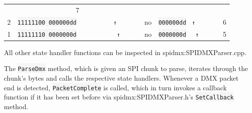 \begin{longtable}[]{@{}ccccc@{}}
\begin{minipage}[t]{0.14\columnwidth}
\end{minipage} & \begin{minipage}[t]{0.14\columnwidth}\centering\strut
7\strut
\end{minipage}\tabularnewline
\begin{minipage}[t]{0.13\columnwidth}\centering\strut
2\strut
\end{minipage} & \begin{minipage}[t]{0.26\columnwidth}\centering\strut
\colorbox{WhiteSmoke}{\lstinline!11111100 000000dd!} \small\verb!          ↑      !\strut
\end{minipage} & \begin{minipage}[t]{0.18\columnwidth}\centering\strut
no\strut
\end{minipage} & \begin{minipage}[t]{0.14\columnwidth}\centering\strut
\colorbox{WhiteSmoke}{\lstinline!000000dd!} \small\verb! ↑      !\strut
\end{minipage} & \begin{minipage}[t]{0.14\columnwidth}\centering\strut
6\strut
\end{minipage}\tabularnewline
\begin{minipage}[t]{0.13\columnwidth}\centering\strut
1\strut
\end{minipage} & \begin{minipage}[t]{0.26\columnwidth}\centering\strut
\colorbox{WhiteSmoke}{\lstinline!11111110 0000000d!} \small\verb!           ↑     !\strut
\end{minipage} & \begin{minipage}[t]{0.18\columnwidth}\centering\strut
no\strut
\end{minipage} & \begin{minipage}[t]{0.14\columnwidth}\centering\strut
\colorbox{WhiteSmoke}{\lstinline!0000000d!} \small\verb!  ↑     !\strut
\end{minipage} & \begin{minipage}[t]{0.14\columnwidth}\centering\strut
5\strut
\end{minipage}\tabularnewline
\bottomrule
\end{longtable}

All other state handler functions can be inspected in
\gls{spidmx:SPIDMXParser.cpp}.

The \colorbox{WhiteSmoke}{\lstinline!ParseDmx!} method, which is given an SPI chunk to parse,
iterates through the chunk's bytes and calls the respective state
handlers. Whenever a DMX packet end is detected,
\colorbox{WhiteSmoke}{\lstinline!PacketComplete!} is called, which in turn invokes a callback
function if it has been set before via \gls{spidmx:SPIDMXParser.h}'s
\colorbox{WhiteSmoke}{\lstinline!SetCallback!} method.

